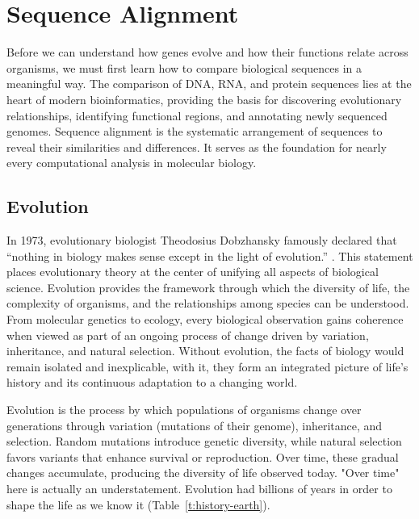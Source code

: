 \chapter{Sequence Alignment}
\label{ch:alignment}

Before we can understand how genes evolve and how their functions relate across organisms,  we must first learn how to compare biological sequences in a meaningful way.  The comparison of DNA, RNA, and protein sequences lies at the heart of modern bioinformatics, providing the basis for discovering evolutionary relationships, identifying functional regions, and annotating newly sequenced genomes. Sequence alignment is the systematic arrangement of sequences to reveal their similarities and differences. It serves as the foundation for nearly every computational analysis in molecular biology.

\section{Evolution}

In 1973, evolutionary biologist Theodosius Dobzhansky famously declared that ``nothing in biology makes sense except in the light of evolution.''
.
This statement places evolutionary theory at the center of unifying all aspects of biological science. Evolution provides the framework through which the diversity of life, the complexity of organisms, and the relationships among species can be understood. From molecular genetics to ecology, every biological observation gains coherence when viewed as part of an ongoing process of change driven by variation, inheritance, and natural selection. Without evolution, the facts of biology would remain isolated and inexplicable, with it, they form an integrated picture of life’s history and its continuous adaptation to a changing world.

Evolution 
is the process by which populations of organisms change over generations through variation (mutations of their genome), inheritance, and selection. Random mutations introduce genetic diversity, while natural selection favors variants that enhance survival or reproduction. Over time, these gradual changes accumulate, producing the diversity of life observed today. "Over time" here is actually an understatement. Evolution had billions of years in order to shape the life as we know it (Table~\ref{t:history-earth}).

